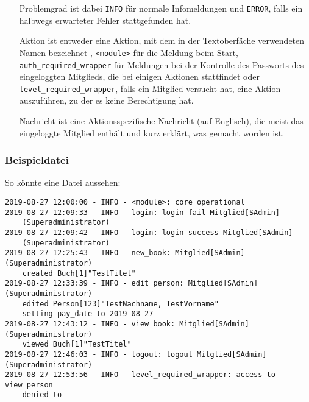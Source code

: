 \begin{itemize}
\item[Problemgrad] ist dabei \verb#INFO# für normale Infomeldungen und \verb#ERROR#, falls ein halbwegs erwarteter Fehler stattgefunden hat.
\item[Aktion] ist entweder eine Aktion, mit dem in der Textoberfäche verwendeten Namen bezeichnet , \verb#<module># für die Meldung beim Start,
\newline \verb#auth_required_wrapper# für Meldungen bei der Kontrolle des Passworts des eingeloggten Mitglieds, die bei einigen Aktionen stattfindet oder \verb#level_required_wrapper#, falls ein Mitglied versucht hat, eine Aktion auszuführen, zu der es keine Berechtigung hat.
\item[Nachricht] ist eine Aktionsspezifische Nachricht (auf Englisch), die meist das eingeloggte Mitglied enthält und kurz erklärt, was gemacht worden ist.
\end{itemize}

\subsubsection{Beispieldatei}
\label{subsubsec:member:log:examples}

So könnte eine Datei aussehen:

\begin{verbatim}
2019-08-27 12:00:00 - INFO - <module>: core operational
2019-08-27 12:09:33 - INFO - login: login fail Mitglied[SAdmin]
	(Superadministrator)
2019-08-27 12:09:42 - INFO - login: login success Mitglied[SAdmin]
	(Superadministrator)
2019-08-27 12:25:43 - INFO - new_book: Mitglied[SAdmin](Superadministrator)
	created Buch[1]"TestTitel"
2019-08-27 12:33:39 - INFO - edit_person: Mitglied[SAdmin](Superadministrator)
	edited Person[123]"TestNachname, TestVorname"
	setting pay_date to 2019-08-27
2019-08-27 12:43:12 - INFO - view_book: Mitglied[SAdmin](Superadministrator)
	viewed Buch[1]"TestTitel"
2019-08-27 12:46:03 - INFO - logout: logout Mitglied[SAdmin](Superadministrator)
2019-08-27 12:53:56 - INFO - level_required_wrapper: access to view_person
	denied to -----
\end{verbatim}



